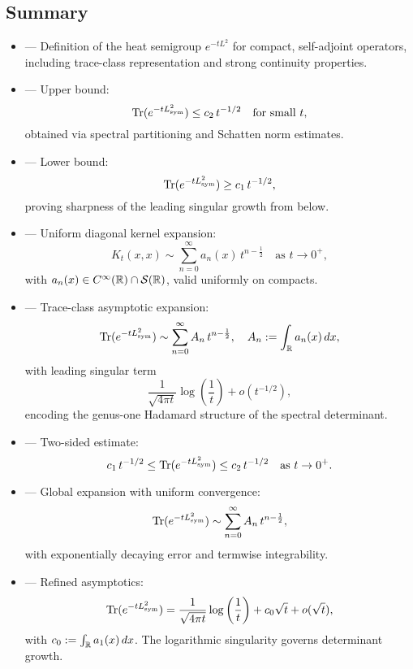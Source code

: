 \subsection*{Summary}

\begin{itemize}
  \item {} — Definition of the heat semigroup \( e^{-tL^2} \) for compact, self-adjoint operators, including trace-class representation and strong continuity properties.

  \item {} — Upper bound:
  \[
  \operatorname{Tr}(e^{-tL_{\mathrm{sym}}^2}) \leq c_2\, t^{-1/2}
  \quad \text{for small } t,
  \]
  obtained via spectral partitioning and Schatten norm estimates.

  \item {} — Lower bound:
  \[
  \operatorname{Tr}(e^{-tL_{\mathrm{sym}}^2}) \geq c_1\, t^{-1/2},
  \]
  proving sharpness of the leading singular growth from below.

  \item {} — Uniform diagonal kernel expansion:
  \[
  K_t(x,x) \sim \sum_{n=0}^\infty a_n(x)\, t^{n - \frac{1}{2}} \quad \text{as } t \to 0^+,
  \]
  with \( a_n(x) \in C^\infty(\mathbb{R}) \cap \mathcal{S}(\mathbb{R}) \), valid uniformly on compacts.

  \item {} — Trace-class asymptotic expansion:
  \[
  \operatorname{Tr}(e^{-tL_{\mathrm{sym}}^2}) \sim \sum_{n=0}^\infty A_n\, t^{n - \frac{1}{2}}, \quad
  A_n := \int_{\mathbb{R}} a_n(x)\, dx,
  \]
  with leading singular term
  \[
  \frac{1}{\sqrt{4\pi t}} \log\left(\frac{1}{t}\right) + o(t^{-1/2}),
  \]
  encoding the genus-one Hadamard structure of the spectral determinant.

  \item {} — Two-sided estimate:
  \[
  c_1\, t^{-1/2} \leq \operatorname{Tr}(e^{-tL_{\mathrm{sym}}^2}) \leq c_2\, t^{-1/2} \quad \text{as } t \to 0^+.
  \]

  \item {} — Global expansion with uniform convergence:
  \[
  \operatorname{Tr}(e^{-tL_{\mathrm{sym}}^2}) \sim \sum_{n=0}^\infty A_n\, t^{n - \frac{1}{2}},
  \]
  with exponentially decaying error and termwise integrability.

  \item {} — Refined asymptotics:
  \[
  \operatorname{Tr}(e^{-tL_{\mathrm{sym}}^2})
  = \frac{1}{\sqrt{4\pi t}} \log\left( \frac{1}{t} \right)
  + c_0 \sqrt{t} + o(\sqrt{t}),
  \]
  with \( c_0 := \int_{\mathbb{R}} a_1(x)\, dx \). The logarithmic singularity governs determinant growth.


\end{itemize}
